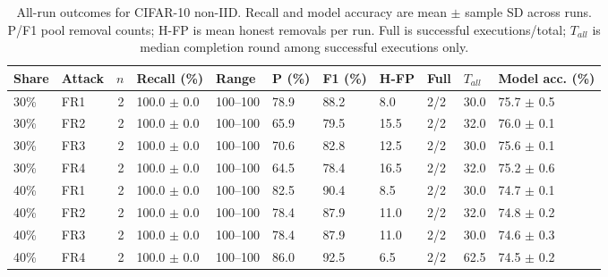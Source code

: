 \documentclass[conference]{IEEEtran}
\begin{document}
\begin{table}[t]\centering\scriptsize
\setlength{\tabcolsep}{3.5pt}
\caption{All-run outcomes for CIFAR-10 non-IID. Recall and model accuracy are mean $\pm$ sample SD across runs. P/F1 pool removal counts; H-FP is mean honest removals per run. Full is successful executions/total; $T_{all}$ is median completion round among successful executions only.}
\begin{tabular}{llrllllllll}\toprule
Share & Attack & $n$ & Recall (\%) & Range & P (\%) & F1 (\%) & H-FP & Full & $T_{all}$ & Model acc. (\%) \\\midrule
30\% & FR1 & 2 & 100.0 $\pm$ 0.0 & 100--100 & 78.9 & 88.2 & 8.0 & 2/2 & 30.0 & 75.7 $\pm$ 0.5 \\
30\% & FR2 & 2 & 100.0 $\pm$ 0.0 & 100--100 & 65.9 & 79.5 & 15.5 & 2/2 & 32.0 & 76.0 $\pm$ 0.1 \\
30\% & FR3 & 2 & 100.0 $\pm$ 0.0 & 100--100 & 70.6 & 82.8 & 12.5 & 2/2 & 30.0 & 75.6 $\pm$ 0.1 \\
30\% & FR4 & 2 & 100.0 $\pm$ 0.0 & 100--100 & 64.5 & 78.4 & 16.5 & 2/2 & 32.0 & 75.2 $\pm$ 0.6 \\
40\% & FR1 & 2 & 100.0 $\pm$ 0.0 & 100--100 & 82.5 & 90.4 & 8.5 & 2/2 & 30.0 & 74.7 $\pm$ 0.1 \\
40\% & FR2 & 2 & 100.0 $\pm$ 0.0 & 100--100 & 78.4 & 87.9 & 11.0 & 2/2 & 32.0 & 74.8 $\pm$ 0.2 \\
40\% & FR3 & 2 & 100.0 $\pm$ 0.0 & 100--100 & 78.4 & 87.9 & 11.0 & 2/2 & 30.0 & 74.6 $\pm$ 0.3 \\
40\% & FR4 & 2 & 100.0 $\pm$ 0.0 & 100--100 & 86.0 & 92.5 & 6.5 & 2/2 & 62.5 & 74.5 $\pm$ 0.2 \\
\bottomrule\end{tabular}\end{table}
\FloatBarrier
\end{document}
